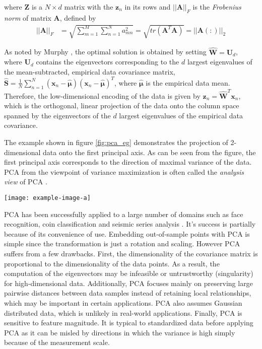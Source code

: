 \noindent
where $\bm{Z}$ is a $N \times d$ matrix with the $\bm{z}_{n}$ in its rows and $||\bm{A}||_{F}$ is the \textit{Frobenius norm} of matrix $\bm{A}$, defined by 
\begin{align}
	||\bm{A}||_{F} &= \sqrt{\sum_{m=1}^{M}\sum_{n=1}^{N}a^{2}_{mn}} = \sqrt{tr(\bm{A}^{T}\bm{A})} = ||\bm{A}(:)||_{2}
\end{align} 

\noindent
As noted by Murphy \citep{Murphy2012}, the optimal solution is obtained by setting $\hat{\bm{W}} = \bm{U}_{d}$, where $\bm{U}_{d}$ contains the eigenvectors corresponding to the $d$ largest eigenvalues of the mean-subtracted, empirical data covariance matrix, $\hat{\bm{S}} = \frac{1}{N}\sum_{n=1}^{N}(\bm{x}_{n}-\hat{\bm{\mu}})(\bm{x}_{n}-\hat{\bm{\mu}})^{T}$, where $\hat{\bm{\mu}}$ is the empirical data mean.  Therefore, the low-dimensional encoding of the data is given by $\bm{z}_n = \hat{\bm{W}}^{T}\bm{x}_n$, which is the orthogonal, linear projection of the data onto the column space spanned by the eigenvectors of the $d$ largest eigenvalues of the empirical data covariance.  

The example shown in figure \ref{fig:pca_eg} demonstrates the projection of 2-dimensional data onto the first principal axis.  As can be seen from the figure, the first principal axis corresponds to the direction of maximal variance of the data.  PCA from the viewpoint of variance maximization is often called the \textit{analysis view} of PCA \citep{Murphy2012}.
\begin{center}
	\begin{figure*}[t]
		\centering
		\texttt{[image: example-image-a]}
		\caption[PCA example.]{Placeholder for PCA projection example.}
		\label{fig:pca_eg}
	\end{figure*}
\end{center}

PCA has been successfully applied to a large  number of domains such as face recognition, coin classification and seismic series analysis \citep{VanDerMaaten2009DRReview}. It's success is partially because of its convenience of use.  Embedding out-of-sample points with PCA is simple since the transformation is just a rotation and scaling. However PCA suffers from a few drawbacks.  First, the dimensionality of the covariance matrix is proportional to the dimensionality of the data points.  As a result, the computation of the eigenvectors may be infeasible or untrustworthy (singularity) for high-dimensional data.  Additionally, PCA focuses mainly on preserving large pairwise distances between data samples instead of retaining local relationships, which may be important in certain applications.  PCA also assumes Gaussian distributed data, which is unlikely in real-world applications. Finally, PCA is sensitive to feature magnitude. It is typical to standardized data before applying PCA as it can be misled by directions in which the variance is high simply because of the measurement scale.

